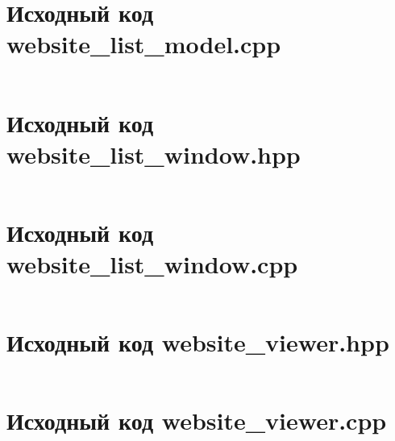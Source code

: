 \documentclass[a4paper, 14pt]{extarticle}
\newenvironment{code}{\captionsetup{type=listing}}{}
\begin{document}
\begin{code}
  \inputminted{cpp}{../task-3/src/website_list_model.hpp}
\end{code}

\newpage

\section{Исходный код website\_list\_model.cpp}
\label{app:website_list_model.cpp}

\begin{code}
  \inputminted{cpp}{../task-3/src/website_list_model.cpp}
\end{code}

\newpage

\section{Исходный код website\_list\_window.hpp}
\label{app:website_list_window.hpp}

\begin{code}
  \inputminted{cpp}{../task-3/src/website_list_window.hpp}
\end{code}

\newpage

\section{Исходный код website\_list\_window.cpp}
\label{app:website_list_window.cpp}

\begin{code}
  \inputminted{cpp}{../task-3/src/website_list_window.cpp}
\end{code}

\newpage

\section{Исходный код website\_viewer.hpp}
\label{app:website_viewer.hpp}

\begin{code}
  \inputminted{cpp}{../task-3/src/website_viewer.hpp}
\end{code}

\newpage

\section{Исходный код website\_viewer.cpp}
\label{app:website_viewer.cpp}
\end{document}
